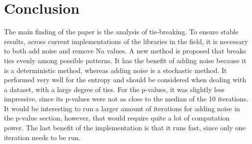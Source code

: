 \chapter{Conclusion}
The main finding of the paper is the analysis of tie-breaking. To ensure stable results, across current implementations of the libraries in the field, it is necessary to both add noise and remove Na values. A new method is proposed that breaks ties evenly among possible patterns. It has the benefit of adding noise because it is a deterministic method, whereas adding noise is a stochastic method. It performed very well for the entropy and should be considered when dealing with a dataset, with a large degree of ties. For the p-values, it was slightly less impressive, since its p-values were not as close to the median of the 10 iterations. It would be interesting to run a larger amount of iterations for adding noise in the p-value section, however, that would require quite a lot of computation power. The last benefit of the implementation is that it runs fast, since only one iteration needs to be run. 